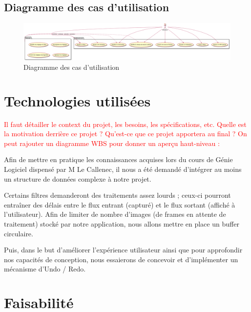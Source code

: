 \begin{landscape}

\section{Diagramme des cas d'utilisation}

\begin{figure}[h]
  \centering
  \includegraphics[width=\textheight]{./images/useCase.png}
  \caption{Diagramme des cas d'utilisation}
  \label{useCase}
\end{figure}

\end{landscape}

\section{Technologies utilisées}

\textcolor{red} 
{
Il faut détailler le context du projet, les besoins, les spécifications, etc.
Quelle est la motivation derrière ce projet ?
Qu'est-ce que ce projet apportera au final ?
On peut rajouter un diagramme WBS pour donner un aperçu haut-niveau :
}

Afin de mettre en pratique les connaissances acquises lors du cours de Génie Logiciel dispensé par M Le Callenec,
il nous a été demandé d'intégrer au moins un structure de données complexe à notre projet.

Certains filtres demanderont des traitements assez lourds ; ceux-ci pourront entraîner des délais entre le flux entrant (capturé) et le flux sortant (affiché à l'utilisateur).
Afin de limiter de nombre d'images (de frames en attente de traitement) stocké par notre application, nous allons mettre en place un buffer circulaire.

Puis, dans le but d'améliorer l'expérience utilisateur ainsi que pour approfondir nos capacités de conception, nous essaierons de concevoir et d'implémenter un mécanisme d'Undo / Redo.

\section{Faisabilité}


